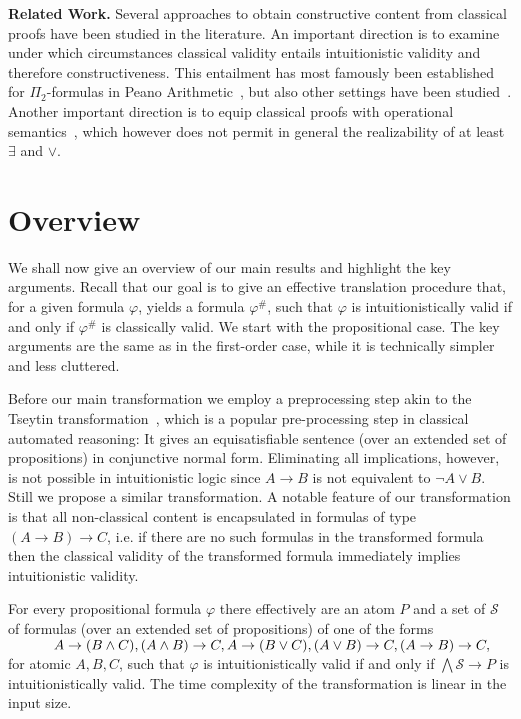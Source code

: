 \documentclass[a4paper,UKenglish,cleveref, autoref, thm-restate]{lipics-v2021}
\begin{document}
\textbf{Related Work.}
Several approaches to obtain constructive content from classical proofs have been studied in the literature.
An important direction is to examine under which circumstances classical validity entails intuitionistic validity and therefore constructiveness.
This entailment has most famously been established for $\Pi_2$-formulas in Peano Arithmetic~\cite{friedman1978classically}, but also other settings have been studied~\cite{schwichtenberg}.
Another important direction is to equip classical proofs with operational semantics~\cite{Control1, Parigot1}, which however does not permit in general the realizability of at least $\exists$ and $\vee$.



\section{Overview}

We shall now give an overview of our main results and highlight the key arguments. Recall that our goal is to give an effective translation procedure that, for a given formula $\varphi$, yields a formula $\varphi^\#$, such that $\varphi$ is intuitionistically valid if and only if $\varphi^\#$ is classically valid. We start with the propositional case. The key arguments are the same as in the first-order case, while it is technically simpler and less cluttered.

Before our main transformation we employ a preprocessing step akin to the Tseytin transformation~\cite{tseitin1983complexity}, which is a popular pre-processing step in classical automated reasoning:
It gives an equisatisfiable sentence (over an extended set of propositions) in conjunctive normal form.
Eliminating all implications, however, is not possible in intuitionistic logic since $A\to B$ is not equivalent to $\neg A\vee B$.
Still we propose a similar transformation.
A notable feature of our transformation is that all non-classical content is encapsulated in formulas of type $(A\to B)\to C$, i.e. if there are no such formulas in the transformed formula then the classical validity of the transformed formula immediately implies intuitionistic validity.

\begin{theorem}
For every propositional formula $\varphi$ there effectively are an atom $P$ and a set of $\mathcal S$ of formulas (over an extended set of propositions) of one of the forms\\
$\text{ \hspace{1cm}} A\to (B\wedge C), (A\wedge B)\to C, A\to (B\vee C), (A\vee B)\to C, (A\to B)\to C,$\\
for atomic $A, B, C$, such that $\varphi$ is intuitionistically valid if and only if $\bigwedge\mathcal S\to P$ is intuitionistically valid. The time complexity of the transformation is linear in the input size.
\end{theorem}
\end{document}
